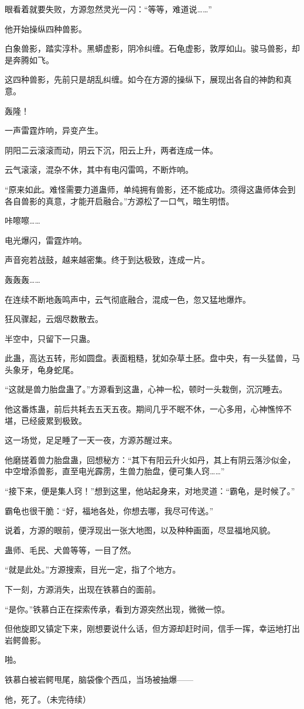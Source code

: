 \begin{this_body}
眼看着就要失败，方源忽然灵光一闪：“等等，难道说……”

他开始操纵四种兽影。

白象兽影，踏实淳朴。黑蟒虚影，阴冷纠缠。石龟虚影，敦厚如山。骏马兽影，却是奔腾如飞。

这四种兽影，先前只是胡乱纠缠。如今在方源的操纵下，展现出各自的神韵和真意。

轰隆！

一声雷霆炸响，异变产生。

阴阳二云滚滚而动，阴云下沉，阳云上升，两者连成一体。

云气滚滚，混杂不休，其中有电闪雷鸣，不断炸响。

“原来如此。难怪需要力道蛊师，单纯拥有兽影，还不能成功。须得这蛊师体会到各自兽影的真意，才能开启融合。”方源松了一口气，暗生明悟。

咔嚓嚓……

电光爆闪，雷霆炸响。

声音宛若战鼓，越来越密集。终于到达极致，连成一片。

轰轰轰……

在连续不断地轰鸣声中，云气彻底融合，混成一色，忽又猛地爆炸。

狂风骤起，云烟尽数散去。

半空中，只留下一只蛊。

此蛊，高达五转，形如圆盘。表面粗糙，犹如杂草土胚。盘中央，有一头猛兽，马头象牙，龟身蛇尾。

“这就是兽力胎盘蛊了。”方源看到这蛊，心神一松，顿时一头栽倒，沉沉睡去。

他这番炼蛊，前后共耗去五天五夜。期间几乎不眠不休，一心多用，心神憔悴不堪，已经疲累到极致。

这一场觉，足足睡了一天一夜，方源苏醒过来。

他磨搓着兽力胎盘蛊，回想秘方：“其下有阳云升火如丹，其上有阴云落沙似金，中空增添兽影，直至电光霹雳，生兽力胎盘，便可集人窍……”

“接下来，便是集人窍！”想到这里，他站起身来，对地灵道：“霸龟，是时候了。”

霸龟也很干脆：“好，福地各处，你想去哪，我尽可传送。”

说着，方源的眼前，便浮现出一张大地图，以及种种画面，尽显福地风貌。

蛊师、毛民、犬兽等等，一目了然。

“就是此处。”方源搜索，目光一定，指了个地方。

下一刻，方源消失，出现在铁慕白的面前。

“是你。”铁慕白正在探索传承，看到方源突然出现，微微一惊。

但他旋即又镇定下来，刚想要说什么话，但方源却赶时间，信手一挥，幸运地打出岩鳄兽影。

啪。

铁慕白被岩鳄甩尾，脑袋像个西瓜，当场被抽爆——

他，死了。（未完待续）

\end{this_body}

